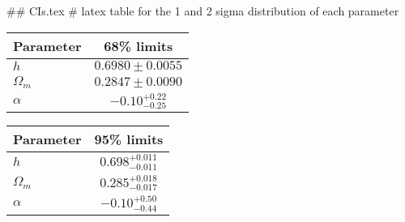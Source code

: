 ## CIs.tex
# latex table for the 1 and 2 sigma distribution of each parameter

\begin{tabular} { l  c}
 Parameter &  68\% limits\\
\hline
{\boldmath$h              $} & $0.6980\pm 0.0055          $\\
{\boldmath$\Omega_m       $} & $0.2847\pm 0.0090          $\\
{\boldmath$\alpha         $} & $-0.10^{+0.22}_{-0.25}     $\\
\hline
\end{tabular}

\begin{tabular} { l  c}
 Parameter &  95\% limits\\
\hline
{\boldmath$h              $} & $0.698^{+0.011}_{-0.011}   $\\
{\boldmath$\Omega_m       $} & $0.285^{+0.018}_{-0.017}   $\\
{\boldmath$\alpha         $} & $-0.10^{+0.50}_{-0.44}     $\\
\hline
\end{tabular}
